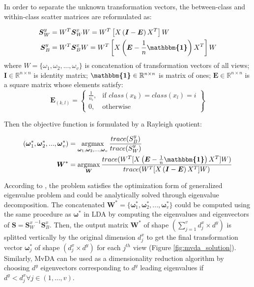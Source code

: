         In order to separate the unknown transformation vectors, the between-class and within-class scatter matrices are reformulated as:

        \begin{align}
            \boldsymbol{S}_W^y &= W^T \boldsymbol{S}_W^x W = W^T\left[X\left(\boldsymbol{I} - \boldsymbol{E}\right)X^T\right]W \label{eq:mvda_Sw_vec} \\
            \boldsymbol{S}_B^y &= W^T \boldsymbol{S}_B^x W = W^T\left[X\left(\boldsymbol{E} - \frac{1}{n}\boldsymbol{\mathbbm{1}}\right)X^T\right]W \label{eq:mvda_Sb_vec}
        \end{align}
        where $W = \{\omega_1,\omega_2,...,\omega_v\}$ is concatenation of transformation vectors of all views; $\boldsymbol{I} \in \mathbb{R}^{n\times n}$ is identity matrix; $\boldsymbol{\mathbbm{1}} \in \mathbb{R}^{n\times n}$ is matrix of ones; $\boldsymbol{E} \in \mathbb{R}^{n\times n}$ is a square matrix whose elements satisfy:
        \begin{equation}
            \boldsymbol{E}_{(k,l)} = \left\{\begin{array}{lr}
                \frac{1}{n_i}, & \text{if } class(x_k) = class(x_l) = i\\
                0, & \text{otherwise}
                \end{array}\right\}
        \end{equation}

        Then the objective function is formulated by a Rayleigh quotient:

        \begin{align}
            (\boldsymbol{\omega}_1^*,\boldsymbol{\omega}_2^*, ..., \boldsymbol{\omega}_v^*) &= \operatorname*{argmax}_{\boldsymbol{\omega}_1, \boldsymbol{\omega}_2,..., \boldsymbol{\omega}_v}\frac{trace({S}_B^y)}{trace({S}_W^y)}\\
            \boldsymbol{W}^* &= \operatorname*{argmax}_{\boldsymbol{W}}\frac{trace(W^{T}[X\left(\boldsymbol{E} - \frac{1}{n}\boldsymbol{\mathbbm{1}}\right)X^{T}]W)}{trace(W^{T}[X\left(\boldsymbol{I} - \boldsymbol{E}\right)X^{T}]W)}
            \label{eq:MvDA}
        \end{align}

        According to \cite{kan2016multi}, the problem satisfies the optimization form of generalized eigenvalue problem and could be analytically solved through eigenvalue decomposition.
        The concatenated $\boldsymbol{W}^* = \{\boldsymbol{\omega}_1^*,\boldsymbol{\omega}_2^*, ..., \boldsymbol{\omega}_v^*\}$ could be computed using the same procedure as $\boldsymbol{\omega}^*$ in LDA by computing the eigenvalues and eigenvectors of $\boldsymbol{S} = {\boldsymbol{S}_W^x}^{-1}\boldsymbol{S}_B^x$.
        Then, the output matrix $\boldsymbol{W}^*$ of shape $(\sum_{j=1}^{v}{d_j^x} \times d^y)$ is splitted vertically by the original dimension $d_j^x$ to get the final transformation vector $\boldsymbol{\omega}_j^*$ of shape $(d_j^x \times d^y)$ for each $j^{th}$ view (Figure \ref{fig:mvda_solution}).
        Similarly, MvDA can be used as a dimensionality reduction algorithm by choosing $d^y$ eigenvectors corresponding to $d^y$ leading eigenvalues if $d^y < d_j^x \forall j \in (1, ..., v)$.

